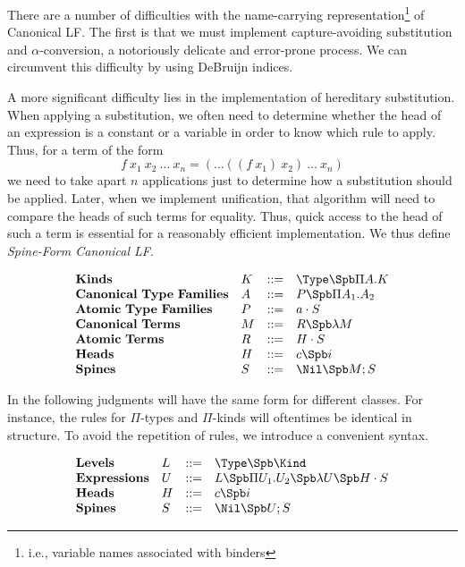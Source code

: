 \renewcommand{\PiTyp}[2]{\Pi #1.#2}
\renewcommand{\Lam}[1]{\lambda #1}

There are a number of difficulties with the name-carrying 
representation\footnote{i.e., variable names associated with binders}
of Canonical LF.  The first is that we must
implement capture-avoiding substitution and $\alpha$-conversion,
a notoriously delicate and error-prone process.
We can circumvent this difficulty
by using DeBruijn indices\cite{DeBruijn80}. 

 A more significant 
difficulty lies in the implementation of hereditary substitution. 
When applying a substitution, we often need to determine whether
the head of an expression is a constant or a variable in order
to know which rule to apply.  Thus, for a term of the form
$$f\ x_1\ x_2\ \ldots\ x_n = (\ldots((f\ x_1)\ x_2)\ \ldots\ x_n) $$
we need to take apart $n$ applications just to determine how
a substitution should be applied.  Later, when we implement
unification, that algorithm will need to compare the heads
of such terms for equality.  Thus, quick access to the head
of such a term is essential for a reasonably efficient implementation.
We thus define \emph{Spine-Form Canonical LF}.

$$
\begin{array}{llll}
\mathbf{Kinds} & K & ::= & \Type \Spb \PiTyp{A}{K} \\
\mathbf{Canonical\ Type\ Families} & A & ::= & P \Spb \PiTyp{A_1}{A_2} \\
\mathbf{Atomic\ Type\ Families} & P & ::= & a\cdot S \\
\mathbf{Canonical\ Terms} & M & ::= & R \Spb \Lam{M} \\
\mathbf{Atomic\ Terms} & R & ::= & H\cdot S \\
\mathbf{Heads} & H & ::= & c \Spb i\\
\mathbf{Spines} & S & ::= & \Nil \Spb M;S\\
\end{array} 
$$

In the following judgments will have the same
form for different classes.  For instance,
the rules for $\Pi$-types and $\Pi$-kinds will
oftentimes be identical in structure.  To avoid the
repetition of rules, we introduce a convenient 
syntax.

$$
\begin{array}{llll}
\mathbf{Levels} & L & ::= & \Type \Spb \Kind \\
\mathbf{Expressions} & U & ::= & L \Spb \PiTyp{U_1}{U_2} \Spb \lambda U \Spb H\cdot S \\
\mathbf{Heads} & H & ::= & c \Spb i\\
\mathbf{Spines} & S & ::= & \Nil \Spb U;S\\
\end{array} 
$$

